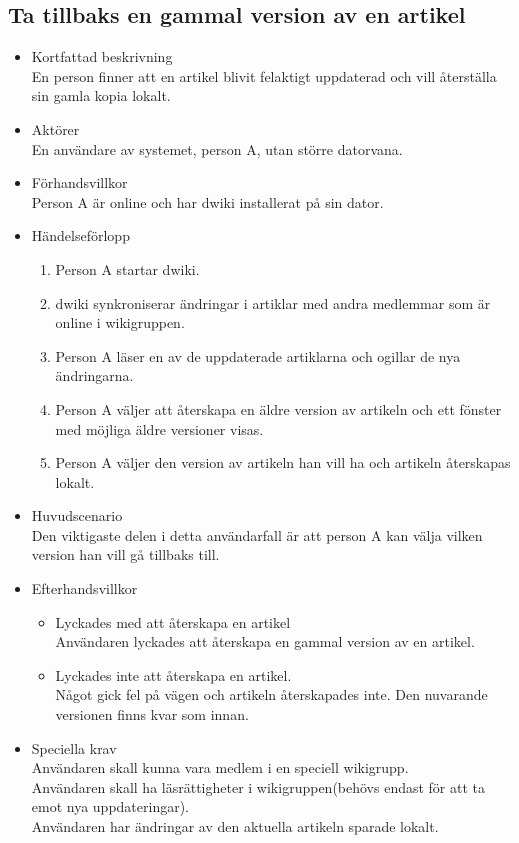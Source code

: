\subsection{Ta tillbaks en gammal version av en artikel}
\begin{itemize}
	\item Kortfattad beskrivning
	\\En person finner att en artikel blivit felaktigt uppdaterad och vill återställa sin gamla kopia lokalt.
	\item Aktörer
	\\En användare av systemet, person A, utan större datorvana.
	\item Förhandsvillkor
	\\Person A är online och har dwiki installerat på sin dator.
	\item Händelseförlopp
	\begin{enumerate}
		\item Person A startar dwiki.
		\item dwiki synkroniserar ändringar i artiklar med andra medlemmar som är online i wikigruppen.
		\item Person A läser en av de uppdaterade artiklarna och ogillar de nya ändringarna.
		\item Person A väljer att återskapa en äldre version av artikeln och ett fönster med möjliga äldre versioner visas.
		\item Person A väljer den version av artikeln han vill ha och artikeln återskapas lokalt.
	\end{enumerate}	
	\item Huvudscenario
	\\Den viktigaste delen i detta användarfall är att person A kan välja vilken version han vill gå tillbaks till.
	\item Efterhandsvillkor	
	\begin{itemize}
		\item Lyckades med att återskapa en artikel
		\\Användaren lyckades att återskapa en gammal version av en artikel.
		\item Lyckades inte att återskapa en artikel.
		\\Något gick fel på vägen och artikeln återskapades inte. Den nuvarande versionen finns kvar som innan.
	\end{itemize}
	\item Speciella krav
	\\Användaren skall kunna vara medlem i en speciell wikigrupp.
	\\Användaren skall ha läsrättigheter i wikigruppen(behövs endast för att ta emot nya uppdateringar).
	\\Användaren har ändringar av den aktuella artikeln sparade lokalt.
\end{itemize}


